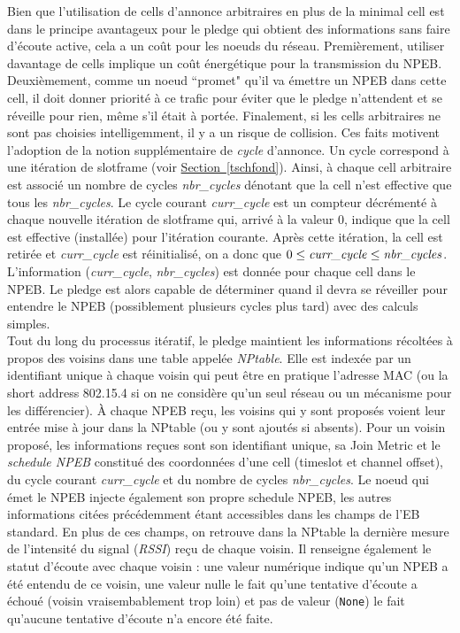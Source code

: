 \documentclass[]{report}
\newcommand{\wordlink}[2]{\hyperref[#2]{#1~\ref{#2}}}
\begin{document}
Bien que l'utilisation de cells d'annonce arbitraires en plus de la minimal cell est dans le principe avantageux pour le pledge qui obtient des informations sans faire d'écoute active, cela a un coût pour les noeuds du réseau. Premièrement, utiliser davantage de cells implique un coût énergétique pour la transmission du NPEB. Deuxièmement, comme un noeud ``promet" qu'il va émettre un NPEB dans cette cell, il doit donner priorité à ce trafic pour éviter que le pledge n'attendent et se réveille pour rien, même s'il était à portée. Finalement, si les cells arbitraires ne sont pas choisies intelligemment, il y a un risque de collision. Ces faits motivent l'adoption de la notion supplémentaire de \textit{cycle} d'annonce. Un cycle correspond à une itération de slotframe (voir \wordlink{Section}{tschfond}). Ainsi, à chaque cell arbitraire est associé un nombre de cycles \textit{nbr\_cycles} dénotant que la cell n'est effective  que tous les \textit{nbr\_cycles}. Le cycle courant \textit{curr\_cycle} est un compteur décrémenté à chaque nouvelle itération de slotframe qui, arrivé à la valeur 0, indique que la cell est effective (installée) pour l'itération courante. Après cette itération, la cell est retirée et \textit{curr\_cycle} est réinitialisé, on a donc que $0 \leq \text{\textit{curr\_cycle}} \leq \text{\textit{nbr\_cycles}}$. L'information (\textit{curr\_cycle}, \textit{nbr\_cycles}) est donnée pour chaque cell dans le NPEB. Le pledge est alors capable de déterminer quand il devra se réveiller pour entendre le NPEB (possiblement plusieurs cycles plus tard) avec des calculs simples.\\

Tout du long du processus itératif, le pledge maintient les informations récoltées à propos des voisins dans une table appelée \textit{NPtable}. Elle est indexée par un identifiant unique à chaque voisin qui peut être en pratique l'adresse MAC (ou la short address 802.15.4 si on ne considère qu'un seul réseau ou un mécanisme pour les différencier). À chaque NPEB reçu, les voisins qui y sont proposés voient leur entrée mise à jour dans la NPtable (ou y sont ajoutés si absents). Pour un voisin proposé, les informations reçues sont son identifiant unique, sa Join Metric et le \textit{schedule NPEB} constitué des coordonnées d'une cell (timeslot et channel offset), du cycle courant \textit{curr\_cycle} et du nombre  de cycles \textit{nbr\_cycles}. Le noeud qui émet le NPEB injecte également son propre schedule NPEB, les autres informations citées précédemment étant accessibles dans les champs de l'EB standard. En plus de ces champs, on retrouve dans la NPtable la dernière mesure de l'intensité du signal (\textit{RSSI}) reçu de chaque voisin. Il renseigne également le statut d'écoute avec chaque voisin : une valeur numérique indique qu'un NPEB a été entendu de ce voisin, une valeur nulle le fait qu'une tentative d'écoute a échoué (voisin vraisembablement trop loin) et pas de valeur (\texttt{None}) le fait qu'aucune tentative d'écoute n'a encore été faite.
\vspace{0.5cm}
\end{document}
